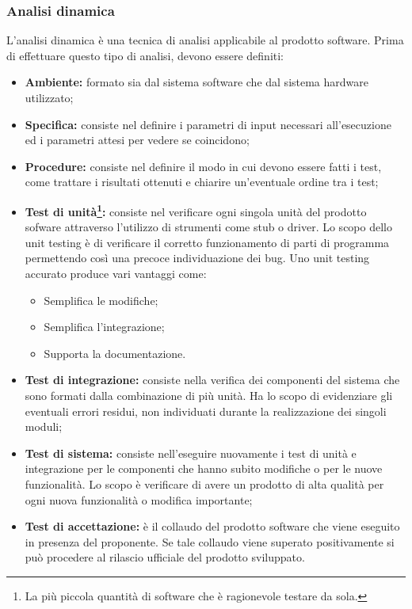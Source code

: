 	\subsubsection{Analisi dinamica}
	L'analisi dinamica è una tecnica di analisi applicabile al prodotto software. 
	Prima di effettuare questo tipo di analisi, devono essere definiti:
	\begin{itemize}
		\item \textbf{Ambiente:} formato sia dal sistema software che dal sistema hardware utilizzato;
		\item \textbf{Specifica:} consiste nel definire i parametri di input necessari all'esecuzione ed i parametri attesi per vedere se coincidono;
		\item \textbf{Procedure:} consiste nel definire il modo in cui devono essere fatti i test, come trattare i risultati ottenuti e chiarire un'eventuale ordine tra i test;
		\item \textbf{Test di unità\footnote{La più piccola quantità di software che è ragionevole testare da sola.}:} consiste nel verificare ogni singola unità del prodotto sofware attraverso l'utilizzo di strumenti come stub o driver. Lo scopo dello unit testing è di verificare il corretto funzionamento di parti di programma permettendo così una precoce individuazione dei bug. Uno unit testing accurato produce vari vantaggi come:
			\begin{itemize}
				\item Semplifica le modifiche;
				\item Semplifica l'integrazione;
				\item Supporta la documentazione.
			\end{itemize}
		\item \textbf{Test di integrazione:} consiste nella verifica dei componenti del sistema che sono formati dalla combinazione di più unità. Ha lo scopo di evidenziare gli eventuali errori residui, non individuati durante la realizzazione dei singoli moduli;
		\item \textbf{Test di sistema:} consiste nell'eseguire nuovamente i test di unità e integrazione per le componenti che hanno subito modifiche o per le nuove funzionalità. Lo scopo è verificare di avere un prodotto di alta qualità per ogni nuova funzionalità o modifica importante;
		\item \textbf{Test di accettazione:} è il collaudo del prodotto software che viene eseguito in presenza del proponente. Se tale collaudo viene superato positivamente si può procedere al rilascio ufficiale del prodotto sviluppato.
	\end{itemize}
	
